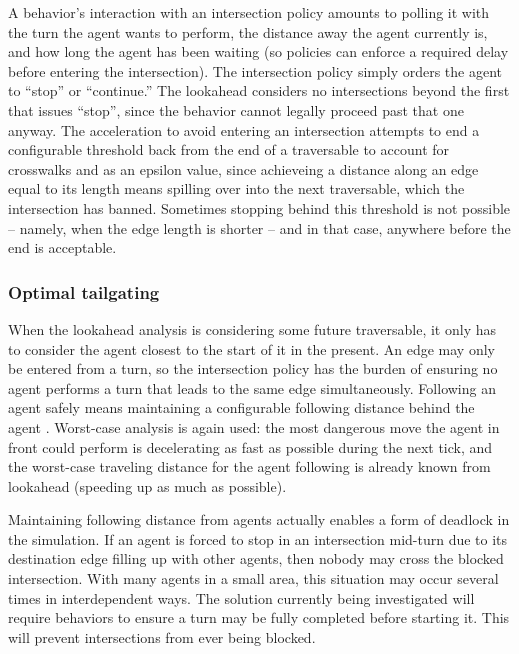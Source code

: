 \documentclass[letterpaper, 10 pt, conference]{ieeeconf}  %
\begin{document}
A behavior's interaction with an intersection policy amounts to polling it with
the turn the agent wants to perform, the distance away the agent currently is,
and how long the agent has been waiting (so policies can enforce a required
delay before entering the intersection). The intersection policy simply orders
the agent to ``stop'' or ``continue.'' The lookahead considers no intersections
beyond the first that issues ``stop'', since the behavior cannot legally proceed
past that one anyway. The acceleration to avoid entering an intersection
attempts to end a configurable threshold back from the end of a traversable to
account for crosswalks and as an epsilon value, since achieveing a distance
along an edge equal to its length means spilling over into the next traversable,
which the intersection has banned. Sometimes stopping behind this threshold is
not possible -- namely, when the edge length is shorter -- and in that case,
anywhere before the end is acceptable.

 

\subsubsection{Optimal tailgating}


When the lookahead analysis is considering some future traversable, it only has
to consider the agent closest to the start of it in the present. An edge may
only be entered from a turn, so the intersection policy has the burden of
ensuring no agent performs a turn that leads to the same edge simultaneously.
Following an agent safely means maintaining a configurable following distance
behind the agent . Worst-case analysis is again used: the most dangerous move the
agent in front could perform is decelerating as fast as possible
during the next tick,
and the worst-case traveling distance for the agent following is already known
from lookahead (speeding up as much as possible).

Maintaining following distance from agents actually enables a form of deadlock
in the simulation. If an agent is forced to stop in an intersection mid-turn due
to its destination edge filling up with other agents, then nobody may cross the
blocked intersection. With many agents in a small area, this situation may
occur several times in interdependent ways. The solution currently being
investigated will require behaviors to ensure a turn may be fully completed
before starting it. This will prevent intersections from ever being blocked.
\end{document}
